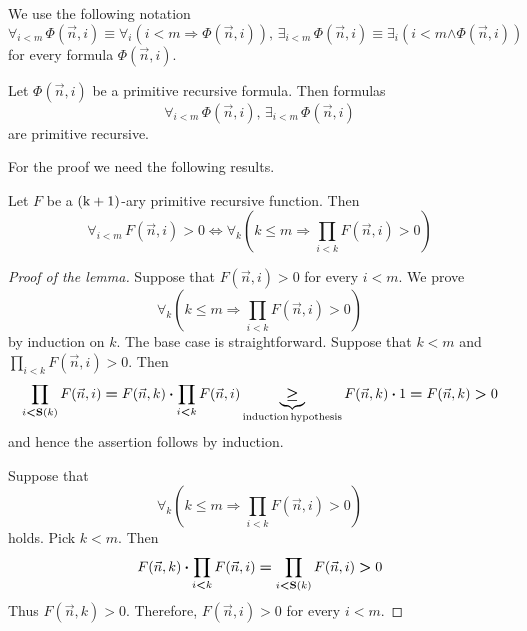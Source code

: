 \documentclass[10pt]{amsart}
\newcommand{\mforall}{\boldsymbol{\forall}}
\newcommand{\mexists}{\boldsymbol{\exists}}
\newcommand{\mra}{\boldsymbol{\Rightarrow}}
\newcommand{\mequiv}{\boldsymbol{\Leftrightarrow}}
\newcommand{\mand}{\boldsymbol{\wedge}}
\newcommand{\mle}{\boldsymbol{<}}
\newcommand{\mge}{\boldsymbol{>}}
\newcommand{\mleq}{\boldsymbol{\leq}}
\newcommand{\mgeq}{\boldsymbol{\geq}}
\newcommand{\meq}{\boldsymbol{=}}
\newcommand{\mdot}{\boldsymbol{\cdot}}
\begin{document}
\begin{remark}\label{remark:bounded_quantifiers}
	We use the following notation
	$$\mforall_{i \mle m}\,\Phi(\vec{n},i) \equiv \mforall_i\left(i \mle m \mra \Phi(\vec{n},i)\right),\,\mexists_{i \mle m}\,\Phi(\vec{n},i) \equiv \mexists_i\left(i \mle m \mand \Phi(\vec{n},i)\right)$$
	for every formula $\Phi(\vec{n},i)$.
\end{remark}

\begin{theorem}\label{theorem:primitive_recursive_formulas_are_closed_under_bounded_quantifiers}
	Let $\Phi(\vec{n},i)$ be a primitive recursive formula. Then formulas
	$$\mforall_{i \mle m}\,\Phi(\vec{n},i),\,\mexists_{i \mle m}\,\Phi(\vec{n},i)$$
	are primitive recursive.
\end{theorem}
\noindent
For the proof we need the following results.

\begin{lemma}\label{lemma:bounded_universal_quantifiers_and_cummulative_products}
	Let $F$ be a $\rm{(k + 1)}$-ary primitive recursive function. Then
	$$\mforall_{i \mle m}\,F(\vec{n},i) \mge 0 \mequiv \mforall_k\left(k \mleq m \mra \prod_{i \mle k}F(\vec{n},i) \mge 0\right)$$
\end{lemma}
\begin{proof}[Proof of the lemma]
	Suppose that $F(\vec{n},i) \mge 0$ for every $i \mle m$. We prove
	$$\mforall_k\left(k \mleq m \mra \prod_{i \mle k}F(\vec{n},i) \mge 0\right)$$
	by induction on $k$. The base case is straightforward. Suppose that $k \mle m$ and $\prod_{i \mle k}F(\vec{n},i) \mge 0$. Then
	$$\prod_{i \mle \bd{S}(k)}F(\vec{n},i) \meq F(\vec{n},k) \mdot \prod_{i \mle k}F(\vec{n},i) \underbrace{\mgeq}_{\mathrm{induction\,hypothesis}}F(\vec{n},k) \mdot 1 \meq F(\vec{n},k) \mge 0$$
	and hence the assertion follows by induction.

	Suppose that
	$$\mforall_k\left(k \mleq m \mra \prod_{i \mle k}F(\vec{n},i) \mge 0\right)$$
	holds. Pick $k \mle m$. Then
	$$F(\vec{n},k)\mdot \prod_{i \mle k} F(\vec{n},i) \meq \prod_{i \mle \bd{S}(k)}F(\vec{n},i) \mge 0$$
	Thus $F(\vec{n},k) \mge 0$. Therefore, $F(\vec{n},i) \mge 0$ for every $i \mle m$.
\end{proof}
\end{document}
